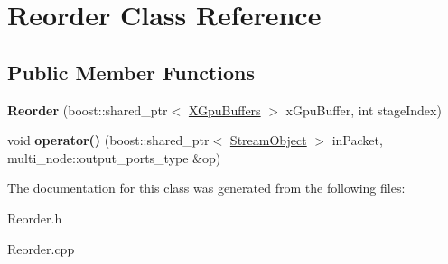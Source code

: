 \hypertarget{class_reorder}{}\section{Reorder Class Reference}
\label{class_reorder}
\subsection*{Public Member Functions}
\begin{DoxyCompactItemize}
\item 
{\bfseries Reorder} (boost\+::shared\+\_\+ptr$<$ \hyperlink{class_x_gpu_buffers}{X\+Gpu\+Buffers} $>$ x\+Gpu\+Buffer, int stage\+Index)\hypertarget{class_reorder_a48506094552db0d404fd41fc8cb5fdc4}{}\label{class_reorder_a48506094552db0d404fd41fc8cb5fdc4}

\item 
void {\bfseries operator()} (boost\+::shared\+\_\+ptr$<$ \hyperlink{class_stream_object}{Stream\+Object} $>$ in\+Packet, multi\+\_\+node\+::output\+\_\+ports\+\_\+type \&op)\hypertarget{class_reorder_a3b5cd9c3db42458dc2946875340c874f}{}\label{class_reorder_a3b5cd9c3db42458dc2946875340c874f}

\end{DoxyCompactItemize}


The documentation for this class was generated from the following files\+:\begin{DoxyCompactItemize}
\item 
Reorder.\+h\item 
Reorder.\+cpp\end{DoxyCompactItemize}
